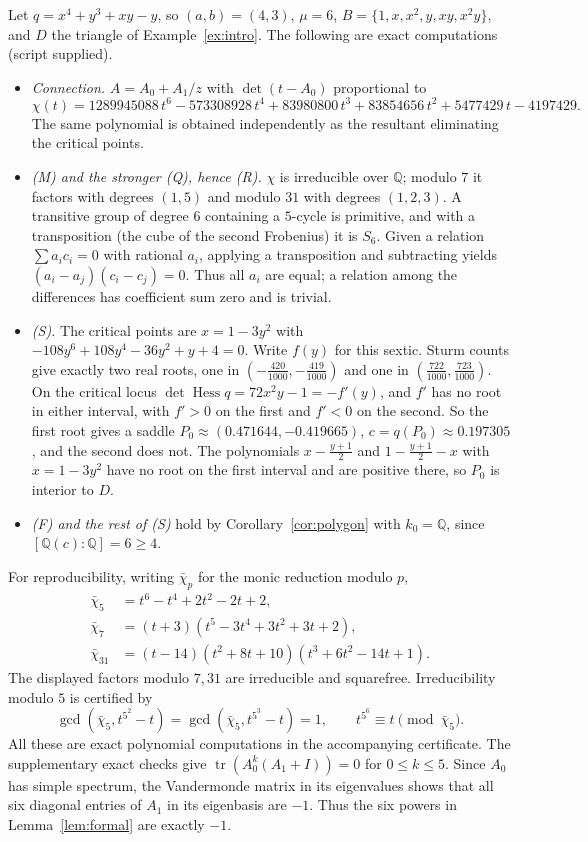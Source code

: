 \documentclass[11pt]{article}
\numberwithin{equation}{section}
\theoremstyle{definition}
\theoremstyle{remark}
\newcommand{\Q}{\mathbb Q}
\begin{document}
Let $q=x^4+y^3+xy-y$, so $(a,b)=(4,3)$, $\mu=6$,
$B=\{1,x,x^2,y,xy,x^2y\}$, and $D$ the triangle of Example~\ref{ex:intro}.
The following are exact computations (script supplied).
\begin{itemize}[leftmargin=1.6em]
\item \emph{Connection.} $A=A_0+A_1/z$ with
 $\det(t-A_0)$ proportional to
 \[
 \chi(t)=1289945088\,t^6-573308928\,t^4+83980800\,t^3+83854656\,t^2+5477429\,t-4197429.
 \]
 The same polynomial is obtained independently as the resultant eliminating
 the critical points.
\item \emph{(M) and the stronger (Q), hence (R).} $\chi$ is irreducible over $\Q$; modulo $7$ it
 factors with degrees $(1,5)$ and modulo $31$ with degrees $(1,2,3)$. A
 transitive group of degree $6$ containing a $5$-cycle is primitive, and with
 a transposition (the cube of the second Frobenius) it is $S_6$. Given a
 relation $\sum a_i c_i=0$ with rational $a_i$, applying a transposition
 and subtracting yields $(a_i-a_j)(c_i-c_j)=0$. Thus all $a_i$ are equal;
 a relation among the differences has coefficient sum zero and is trivial.
\item \emph{(S).} The critical points are $x=1-3y^2$ with
 $-108y^6+108y^4-36y^2+y+4=0$. Write $f(y)$ for this sextic. Sturm counts give exactly two real roots, one in
 $(-\tfrac{420}{1000},-\tfrac{419}{1000})$ and one in
 $(\tfrac{722}{1000},\tfrac{723}{1000})$. On the critical locus
 $\det\operatorname{Hess}q=72x^2y-1=-f'(y)$, and $f'$ has no root in either
 interval, with $f'>0$ on the first and $f'<0$ on the second. So the first root
 gives a saddle $P_0\approx(0.471644,-0.419665)$, $c=q(P_0)\approx0.197305$,
 and the second does not. The polynomials $x-\tfrac{y+1}2$ and
 $1-\tfrac{y+1}2-x$ with $x=1-3y^2$ have no root on the first interval and are
 positive there, so $P_0$ is interior to $D$.
\item \emph{(F) and the rest of (S)} hold by Corollary~\ref{cor:polygon} with
 $k_0=\Q$, since $[\Q(c):\Q]=6\ge4$.
\end{itemize}
For reproducibility, writing $\bar\chi_p$ for the monic reduction modulo $p$,
\begin{align*}
 \bar\chi_5&=t^6-t^4+2t^2-2t+2,\\
 \bar\chi_7&=(t+3)(t^5-3t^4+3t^2+3t+2),\\
 \bar\chi_{31}&=(t-14)(t^2+8t+10)(t^3+6t^2-14t+1).
\end{align*}
The displayed factors modulo $7,31$ are irreducible and squarefree.
Irreducibility modulo $5$ is certified by
\[
 \gcd(\bar\chi_5,t^{5^2}-t)=\gcd(\bar\chi_5,t^{5^3}-t)=1,
 \qquad t^{5^6}\equiv t\pmod{\bar\chi_5}.
\]
All these are exact polynomial computations in the accompanying certificate.
The supplementary exact checks give
$\operatorname{tr}(A_0^k(A_1+I))=0$ for $0\le k\le5$.
Since $A_0$ has simple spectrum, the Vandermonde matrix in its eigenvalues
shows that all six diagonal entries of $A_1$ in its eigenbasis are $-1$.
Thus the six powers in Lemma~\ref{lem:formal} are exactly $-1$.
\end{document}
